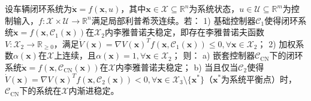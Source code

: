     \begin{theorem}[控制器嵌套的稳定性]
    设车辆闭环系统为$\dot{\bm{x}} = f(\bm{x}, u)$，其中$\bm{x} \in \mathcal{X} \subseteq \mathbb{R}^n$为系统状态，$u \in \mathcal{U} \subseteq \mathbb{R}^m$为控制输入，$f: \mathcal{X} \times \mathcal{U} \to \mathbb{R}^n$满足局部利普希茨连续。若：
    1) 基础控制器$\mathcal{C}_1$使得闭环系统$\dot{\bm{x}} = f(\bm{x}, \mathcal{C}_1(\bm{x}))$在$\mathcal{X}_2$内李雅普诺夫稳定，即存在李雅普诺夫函数$V: \mathcal{X}_2 \to \mathbb{R}_{\geq 0}$，满足$\dot{V}(\bm{x}) = \nabla V(\bm{x})^T f(\bm{x}, \mathcal{C}_1(\bm{x})) \leq 0, \forall \bm{x} \in \mathcal{X}_2$；
    2) 加权系数$\alpha(\bm{x})$在$\mathcal{X}$上连续，且$\alpha(\bm{x}) = 1, \forall \bm{x} \in \mathcal{X}_2$；
    则：
    a) 嵌套控制器$\mathcal{C}_{\text{CN}}$下的闭环系统$\dot{\bm{x}} = f(\bm{x}, \mathcal{C}_{\text{CN}}(\bm{x}))$在$\mathcal{X}$内李雅普诺夫稳定；
    b) 当且仅当$\mathcal{C}_2$使得$\dot{V}(\bm{x}) = \nabla V(\bm{x})^T f(\bm{x}, \mathcal{C}_2(\bm{x})) < 0, \forall \bm{x} \in \mathcal{X}_3 \setminus \{\bm{x}^*\}$（$\bm{x}^*$为系统平衡点）时，$\mathcal{C}_{\text{CN}}$下的系统在$\mathcal{X}$内渐进稳定。
    \end{theorem}

